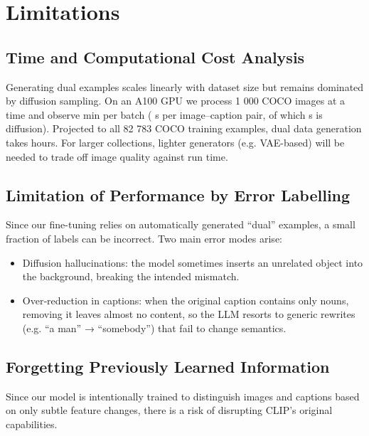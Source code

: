 \documentclass[11pt,letterpaper]{article}
\begin{document}

\section{Limitations}
\subsection{Time and Computational Cost Analysis}
Generating dual examples scales linearly with dataset size but remains dominated by diffusion sampling. On an A100 GPU we process 1 000 COCO images at a time and observe  min per batch ( s per image–caption pair, of which  s is diffusion). Projected to all 82 783 COCO training examples, dual data generation takes  hours. For larger collections, lighter generators (e.g. VAE-based) will be needed to trade off image quality against run time.

\subsection{Limitation of Performance by Error Labelling}
Since our fine-tuning relies on automatically generated “dual” examples, a small fraction of labels can be incorrect. Two main error modes arise:
\begin{itemize}
    \item Diffusion hallucinations: the model sometimes inserts an unrelated object into the background, breaking the intended mismatch.
    \item Over‐reduction in captions: when the original caption contains only nouns, removing it leaves almost no content, so the LLM resorts to generic rewrites (e.g. “a man” → “somebody”) that fail to change semantics.
\end{itemize}

\subsection{Forgetting Previously Learned Information}
Since our model is intentionally trained to distinguish images and captions based on only subtle feature changes, there is a risk of disrupting CLIP’s original capabilities.
\end{document}
